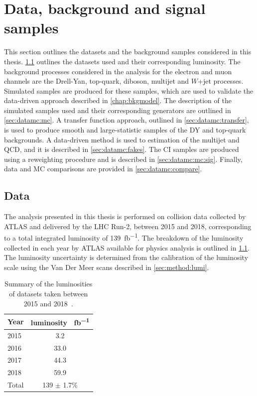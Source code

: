 \chapter{Data, background and signal samples}\label{chap:datamc}

This section outlines the datasets and the background samples considered in this thesis. \cref{sec:datamc:data} outlines the datasets used and their corresponding luminosity. The background processes considered in the analysis for the electron and muon channels are the Drell-Yan, top-quark, diboson, multijet and $W$+jet processes. Simulated samples are produced for these samples, which are used to validate the data-driven approach described in \cref{chap:bkgmodel}. The description of the simulated samples used and their corresponding generators are outlined in \cref{sec:datamc:mc}. A transfer function approach, outlined in \cref{sec:datamc:transfer}, is used to produce smooth and large-statistic samples of the DY and top-quark backgrounds. A data-driven method is used to estimation of the multijet and QCD, and it is described in \cref{sec:datamc:fakes}. The CI samples are produced using a reweighting procedure and is described in \cref{sec:datamc:mc:sig}. Finally, data and MC comparisons are provided in \cref{sec:datamc:compare}.


\section{Data}\label{sec:datamc:data}
The analysis presented in this thesis is performed on \emph{\protonproton} collision data collected by ATLAS and delivered by the LHC Run-2, between 2015 and 2018, corresponding to a total integrated luminosity of \SI{139}{\femto\barn^{-1}}. The breakdown of the luminosity collected in each year by ATLAS available for physics analysis is outlined in \cref{tab:data:lumi}. The luminosity uncertainty is determined from the calibration of the luminosity scale using the Van Der Meer scans described in \cref{sec:method:lumi}. 
\begin{table}[h]
    \centering
    \begin{tabular}{l|c}
        Year & luminosity \SI{}{\femto\barn^{-1}} \\
        \hline
        2015 & 3.2 \\
        2016 & 33.0 \\
        2017 & 44.3 \\
        2018 & 59.9 \\
        \hline 
        \hline
        Total & 139 $\pm$ 1.7\% \\
	\end{tabular}
    \caption[Summary of the luminosities of datasets taken between 2015 and 2018]{Summary of the luminosities of datasets taken between 2015 and 2018~\cite{ATLAS:lumiPlots}.}
    \label{tab:data:lumi}
  \end{table}


